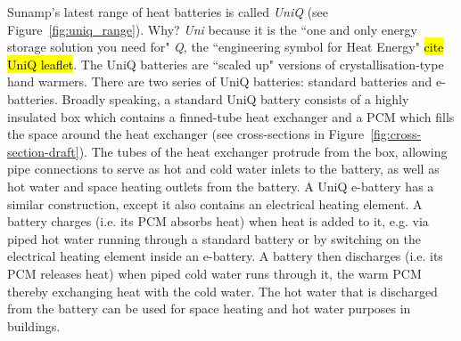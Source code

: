 Sunamp's latest range of heat batteries is called \emph{UniQ} (see Figure~\ref{fig:uniq_range}).
Why?
\emph{Uni} because it is the ``one and only energy storage solution you need for" \emph{Q}, the ``engineering symbol for Heat Energy" \hl{cite UniQ leaflet}.
The UniQ batteries are ``scaled up" versions of crystallisation-type hand warmers.
There are two series of UniQ batteries: standard batteries and e-batteries.
Broadly speaking, a standard UniQ battery consists of a highly insulated box which contains a finned-tube heat exchanger and a PCM which fills the space around the heat exchanger (see cross-sections in Figure~\ref{fig:cross-section-draft}).
The tubes of the heat exchanger protrude from the box, allowing pipe connections to serve as hot and cold water inlets to the battery, as well as hot water and space heating outlets from the battery.
A UniQ e-battery has a similar construction, except it also contains an electrical heating element.
A battery charges (i.e. its PCM absorbs heat) when heat is added to it, e.g. via piped hot water running through a standard battery or by switching on the electrical heating element inside an e-battery.
A battery then discharges (i.e. its PCM releases heat) when piped cold water runs through it, the warm PCM thereby exchanging heat with the cold water.
The hot water that is discharged from the battery can be used for space heating and hot water purposes in buildings.



